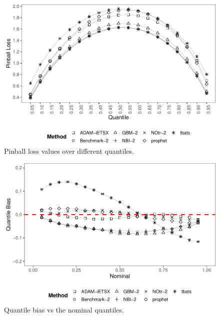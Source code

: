 \documentclass[]{elsarticle} %
\begin{document}
\begin{figure}[H]

{\centering \includegraphics[width=0.9\linewidth]{paper_files/figure-latex/Pinball-1} 

}

\caption{Pinball loss values over different quantiles.}\label{fig:Pinball}
\end{figure}

\begin{figure}[H]

{\centering \includegraphics[width=0.9\linewidth]{paper_files/figure-latex/quantile-bias-1} 

}

\caption{Quantile bias vs the nominal quantiles.}\label{fig:quantile-bias}
\end{figure}
\end{document}

